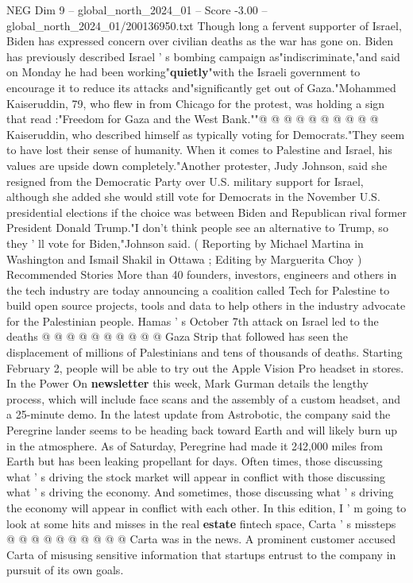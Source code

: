 \begin{textsample}{NEG Dim 9 – global\_north\_2024\_01 – Score -3.00 – global\_north\_2024\_01/200136950.txt}
Though long a fervent supporter of Israel, Biden has expressed concern over civilian deaths as the war has gone on.
Biden has previously described Israel ' s bombing campaign as"indiscriminate,"and said on Monday he had been working"\textbf{quietly}"with the Israeli government to encourage it to reduce its attacks and"significantly get out of Gaza."Mohammed Kaiseruddin, 79, who flew in from Chicago for the protest, was holding a sign that read :"Freedom for Gaza and the West Bank.""@ @ @ @ @ @ @ @ @ @ Kaiseruddin, who described himself as typically voting for Democrats."They seem to have lost their sense of humanity.
When it comes to Palestine and Israel, his values are upside down completely."Another protester, Judy Johnson, said she resigned from the Democratic Party over U.S. military support for Israel, although she added she would still vote for Democrats in the November U.S. presidential elections if the choice was between Biden and Republican rival former President Donald Trump."I don't think people see an alternative to Trump, so they ' ll vote for Biden,"Johnson said. ( Reporting by Michael Martina in Washington and Ismail Shakil in Ottawa ; Editing by Marguerita Choy ) Recommended Stories More than 40 founders, investors, engineers and others in the tech industry are today announcing a coalition called Tech for Palestine to build open source projects, tools and data to help others in the industry advocate for the Palestinian people.
Hamas ' s October 7th attack on Israel led to the deaths @ @ @ @ @ @ @ @ @ @ Gaza Strip that followed has seen the displacement of millions of Palestinians and tens of thousands of deaths.
Starting February 2, people will be able to try out the Apple Vision Pro headset in stores.
In the Power On \textbf{newsletter} this week, Mark Gurman details the lengthy process, which will include face scans and the assembly of a custom headset, and a 25-minute demo.
In the latest update from Astrobotic, the company said the Peregrine lander seems to be heading back toward Earth and will likely burn up in the atmosphere.
As of Saturday, Peregrine had made it 242,000 miles from Earth but has been leaking propellant for days.
Often times, those discussing what ' s driving the stock market will appear in conflict with those discussing what ' s driving the economy.
And sometimes, those discussing what ' s driving the economy will appear in conflict with each other.
In this edition, I ' m going to look at some hits and misses in the real \textbf{estate} fintech space, Carta ' s missteps @ @ @ @ @ @ @ @ @ @ Carta was in the news.
A prominent customer accused Carta of misusing sensitive information that startups entrust to the company in pursuit of its own goals.

\end{textsample}
